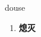 
\begin{frame}
{\huge douse}
\begin{center}
\begin{enumerate}\Large
  \item \textbf{熄灭}
\end{enumerate}
\end{center}
\end{frame}
